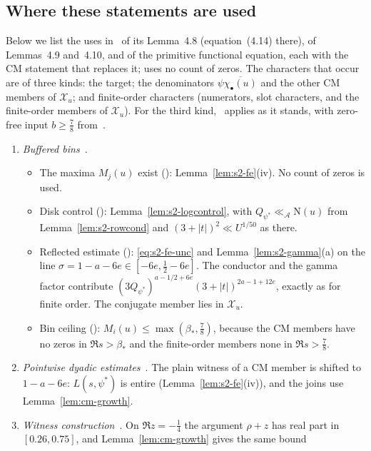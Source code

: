 \documentclass[11pt]{article}
\numberwithin{equation}{section}
\newcommand{\N}{\mathrm N}
\begin{document}
\subsection{Where these statements are used}\label{sec:s2-uses}
Below we list the uses in~\cite{OAI78} of its Lemma~4.8 (equation~(4.14) there), of Lemmas~4.9 and~4.10, and of
the primitive functional equation, each with the CM statement that replaces it; \cite{OAI78} uses no count of
zeros. The characters that occur are of three kinds: the target; the denominators $\psi\overline{\chi_\bullet(u)}$
and the other CM members of $\mathcal X_u$; and finite-order characters (numerators, slot characters, and the
finite-order members of $\mathcal X_u$). For the third kind,~\cite{OAI78} applies as it stands, with zero-free
input $b\ge\frac78$ from~\cite[Theorem~1.1]{OAI78}.
\begin{enumerate}
\item \emph{Buffered bins}~\cite[Lemma~8.1]{OAI78}.
 \begin{itemize}
 \item The maxima $M_j(u)$ exist (\cite[proof of Lemma~8.1]{OAI78}): Lemma~\ref{lem:s2-fe}(iv). No count of zeros is used.
 \item Disk control (\cite[proof of Lemma~8.1]{OAI78}): Lemma~\ref{lem:s2-logcontrol}, with $Q_{\psi^*}\ll_{\mathcal A}\N(u)$ from
  Lemma~\ref{lem:s2-rowcond} and $(3+|t|)^2\ll U^{1/50}$ as there.
 \item Reflected estimate (\cite[proof of Lemma~8.1]{OAI78}): \eqref{eq:s2-fe-unc} and Lemma~\ref{lem:s2-gamma}(a) on the line
  $\sigma=1-a-6e\in[-6e,\frac12-6e]$. The conductor and the gamma factor contribute
  $(3Q_{\psi^*})^{a-1/2+6e}(3+|t|)^{2a-1+12e}$, exactly as for finite order. The conjugate member lies in
  $\mathcal X_u$.
 \item Bin ceiling (\cite[Section~8.1]{OAI78}): $M_i(u)\le\max(\beta_*,\frac78)$, because the CM members have no zeros
  in $\Re s>\beta_*$ and the finite-order members none in $\Re s>\frac78$.
 \end{itemize}
\item \emph{Pointwise dyadic estimates}~\cite[Lemma~8.2 and its proof]{OAI78}. The plain witness of a
 CM member is shifted to $1-a-6e$: $L(s,\psi^*)$ is entire (Lemma~\ref{lem:s2-fe}(iv)), and the joins use
 Lemma~\ref{lem:cm-growth}.
\item \emph{Witness construction}~\cite[Prop.~8.3 and its proof]{OAI78}. On $\Re z=-\frac14$ the
 argument $\rho+z$ has real part in $[0.26,0.75]$, and Lemma~\ref{lem:cm-growth} gives the same bound

\end{enumerate}
\end{document}
